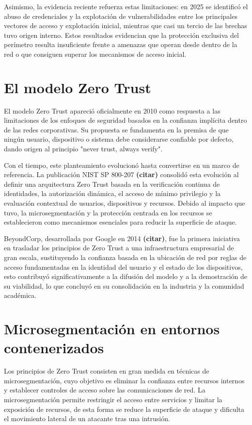 \documentclass[11pt,spanish,listoffigures,listoftables]{tfgetsinf}
\begin{document}
    Asimismo, la evidencia reciente refuerza estas limitaciones: en 2025 se identificó el abuso de credenciales y la explotación de vulnerabilidades entre los principales vectores de acceso y explotación inicial, mientras que casi un tercio de las brechas tuvo origen interno. Estos resultados evidencian que la protección exclusiva del perímetro resulta insuficiente frente a amenazas que operan desde dentro de la red o que consiguen superar los mecanismos de acceso inicial.

    \section{El modelo Zero Trust}
    El modelo Zero Trust apareció oficialmente en 2010 como respuesta a las limitaciones de los enfoques de seguridad basados en la confianza implícita dentro de las redes corporativas. Su propuesta se fundamenta en la premisa de que ningún usuario, dispositivo o sistema debe considerarse confiable por defecto, dando origen al principio "never trust, always verify".
     
    Con el tiempo, este planteamiento evolucionó hasta convertirse en un marco de referencia. La publicación NIST SP 800-207 \textbf{(citar)} consolidó esta evolución al definir una arquitectura Zero Trust basada en la verificación continua de identidades, la autorización dinámica, el acceso de mínimo privilegio y la evaluación contextual de usuarios, dispositivos y recursos. Debido al impacto que tuvo, la microsegmentación y la protección centrada en los recursos se establecieron como mecanismos esenciales para reducir la superficie de ataque.
    
    BeyondCorp, desarrollada por Google en 2014 \textbf{(citar)}, fue la primera iniciativa en trasladar los principios de Zero Trust a una infraestructura empresarial de gran escala, sustituyendo la confianza basada en la ubicación de red por reglas de acceso fundamentadas en la identidad del usuario y el estado de los dispositivos, esto contribuyó significativamente a la difusión del modelo y a la demostración de su viabilidad, lo que concluyó en su consolidación en la industria y la comunidad académica.

    \section{Microsegmentación en entornos contenerizados}
    Los principios de Zero Trust consisten en gran medida en técnicas de microsegmentación, cuyo objetivo es eliminar la confianza entre recursos internos y establecer controles de acceso sobre las comunicaciones de red. La microsegmentación permite restringir el acceso entre servicios y limitar la exposición de recursos, de esta forma se reduce la superficie de ataque y dificulta el movimiento lateral de un atacante tras una intrusión.
    
\end{document}
